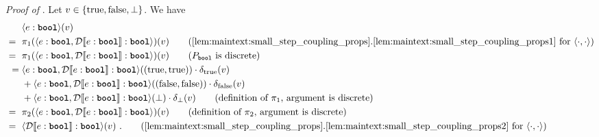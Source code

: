 \emph{Proof of }. Let $v \in \{\textnormal{true},\textnormal{false},\bot\}$. We have
%
\begin{align*}
	& \bigsem{e : \bool}(v) \\
	{}={}~& \pi_1(\bigsem{e:\bool, \discretize{e : \bool} : {\bool}})(v)
		\tag{\Cref{lem:maintext:small_step_coupling_props}.\ref{lem:maintext:small_step_coupling_props1} for $\bigsem{\cdot,\cdot}$} \\
    {}={}~& \pi_1(\bigsem{e:\bool, \discretize{e : \bool} : {\bool}})(v)
    \tag{$P_\bool$ is discrete} \\
    {}={} & \bigsem{e : \bool, \discretize{e : \bool}:{\bool}}((\true,\true))\cdot \delta_{\true}(v) \\
    &{}+ 
    \bigsem{e : \bool, \discretize{e : \bool}:{\bool}}((\false,\false))\cdot \delta_{\false}(v) \\
    &{}+ 
    \bigsem{e : \bool, \discretize{e : \bool}:{\bool}}(\bot)\cdot \delta_{\bot}(v) 
    \tag{definition of $\pi_1$, argument is discrete} \\
    {}={}~& \pi_2(\bigsem{e:\bool, \discretize{e : \bool} : {\bool}})(v)
    \tag{definition of $\pi_2$, argument is discrete} \\
    {}={}~& \bigsem{\discretize{e : \bool}:{\bool}}(v)~.
    \tag{\Cref{lem:maintext:small_step_coupling_props}.\ref{lem:maintext:small_step_coupling_props2} for $\bigsem{\cdot,\cdot}$}
\end{align*}

 
